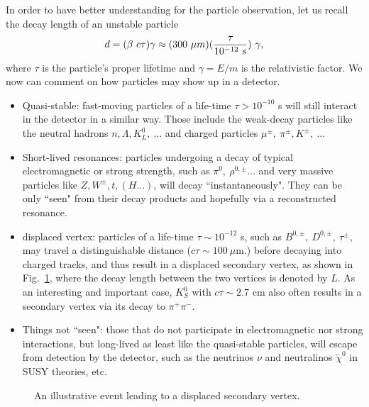 \documentclass[prd,aps,floats,preprintnumbers,preprint,superscriptaddress,floatfix,nofootinbib]{revtex4}
\begin{document}
In order to have  better understanding for the particle observation, 
let us recall the decay length of an unstable particle
\begin{equation}
d=(\beta\ c \tau)\gamma \approx (300\ \mu m) ({\tau\over 10^{-12}\ s})\ \gamma,
\end{equation}
where $\tau$ is the particle's proper  lifetime and $\gamma=E/m$ is the relativistic factor. 
We now can comment on how particles may show up in a detector.
\begin{itemize}
\item
Quasi-stable:  fast-moving particles of a life-time $\tau > 10^{-10}$ s
will still interact in the detector in a similar way. 
Those include the weak-decay particles like the neutral hadrons 
$n,\Lambda,K^0_L,\ ... $ and charged particles $ \mu^\pm,\ \pi^\pm, K^\pm,\ ...$
\item Short-lived resonances: particles undergoing a decay of  typical  
electromagnetic or strong strength, such as $\pi^{0},\ \rho^{0,\pm}$... and
very massive particles like 
$Z,W^\pm,t, (H ...)$, will decay ``instantaneously". They can be only ``seen"
from their decay products and hopefully via a reconstructed resonance.
\item
displaced vertex:  particles of a life-time $\tau \sim 10^{-12}$ s, such as
$B^{0,\pm},\ D^{0,\pm},\ \tau^\pm,$ may travel a distinguishable distance
($c\tau \sim 100\ \mu$m.)
before decaying into charged tracks, and thus result in a displaced
secondary vertex, as shown in Fig.~\ref{fig:vertex}, where the
decay length between the two vertices is denoted by $L$.
As an interesting and important case, $K_S^0$ with $c\tau \sim 2.7$ cm
also often results in a secondary vertex via its decay to $\pi^+\pi^-$.
\item
Things not ``seen":  those that do not participate in electromagnetic nor
strong interactions, but long-lived as least like the quasi-stable particles,
will escape from detection by the detector, such as the neutrinos $\nu$
and neutralinos $\tilde\chi^0$ in SUSY theories, etc.
\end{itemize}

\begin{center}
\begin{figure}[tb]
\caption{An illustrative event leading to a displaced secondary vertex.
\label{fig:vertex}}
\end{figure}
\end{center}
\end{document}
